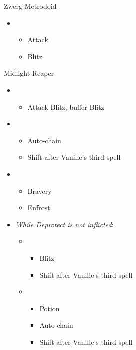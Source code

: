 \begin{multicols}{2}
	\begin{battle}[0:05]{Zwerg Metrodoid}
		\begin{itemize}
			\item \first
			      \begin{itemize}
				      \item Attack
				      \item Blitz
			      \end{itemize}
		\end{itemize}
	\end{battle}

	\begin{battle}[1:10]{Midlight Reaper}
		\begin{itemize}
			\item \first
			      \begin{itemize}
				      \item Attack-Blitz, buffer Blitz
			      \end{itemize}
			\item \fifth
			      \begin{itemize}
				      \item Auto-chain
				      \item Shift after Vanille's third spell
			      \end{itemize}
			\item \third
			      \begin{itemize}
				      \item Bravery
				      \item Enfrost
			      \end{itemize}
			\item \textit{While Deprotect is not inflicted}:
			      \begin{itemize}
				      \item \sixth
				            \begin{itemize}
					            \item Blitz
					            \item Shift after Vanille's third spell
				            \end{itemize}
				      \item \fifth
				            \begin{itemize}
					            \item Potion
					            \item Auto-chain
					            \item Shift after Vanille's third spell

\end{itemize}
\end{itemize}
\end{itemize}
\end{battle}
\end{multicols}
